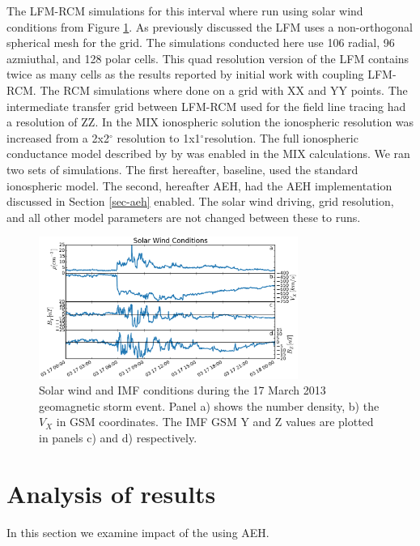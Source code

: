 \documentclass[draft,jgrga]{agutex}
\begin{document}
\begin{article}
The LFM-RCM simulations for this interval where run using solar wind conditions from Figure \ref{sw-fig}.  As previously discussed the LFM uses a non-orthogonal spherical mesh for the grid.  The simulations conducted here use 106 radial, 96 azmiuthal, and 128 polar cells.  This quad resolution version of the LFM contains twice as many cells as the results reported by \cite{Pembroke:2012gc} initial work with coupling LFM-RCM.   The RCM simulations where done on a grid with XX and YY points.  The intermediate transfer grid between LFM-RCM used for the field line tracing had a resolution of ZZ.  In the MIX ionospheric solution the ionospheric resolution was increased from a 2x2$^{\circ}$ resolution to 1x1$^{\circ}$resolution.  The full ionospheric conductance model described by \cite{2009JGRA..11401204W} by was enabled in the MIX calculations.  We ran two sets of simulations.  The first hereafter, baseline, used the standard ionospheric model.  The second, hereafter AEH, had the AEH implementation discussed in Section \ref{sec-aeh} enabled.  The solar wind driving, grid resolution, and all other model parameters are not changed between these to runs. 

\begin{figure}
\noindent\includegraphics[width=20pc]{JGRPaper-SWFig.pdf}
\caption{\label{sw-fig} 
Solar wind and IMF conditions during the 17 March 2013 geomagnetic storm event.  Panel a) shows the number density, b) the $V_X$ in GSM coordinates.  The IMF GSM Y and Z values are plotted in panels c) and d) respectively.} 
\end{figure}

\section{Analysis of results}
\label{sec-analysis}
In this section we examine impact of the using AEH.


\end{article}
\end{document}
